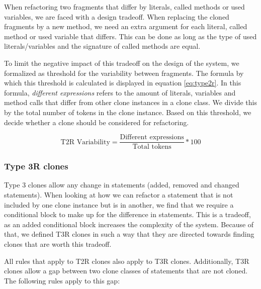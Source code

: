 \documentclass[a4paper]{article}
\begin{document}
When refactoring two fragments that differ by literals, called methods or used variables, we are faced with a design tradeoff. When replacing the cloned fragments by a new method, we need an extra argument for each literal, called method or used variable that differs. This can be done as long as the type of used literals/variables and the signature of called methods are equal.

To limit the negative impact of this tradeoff on the design of the system, we formalized as threshold for the variability between fragments. The formula by which this threshold is calculated is displayed in equation \ref{eq:type2r}. In this formula, \textit{different expressions} refers to the amount of literals, variables and method calls that differ from other clone instances in a clone class. We divide this by the total number of tokens in the clone instance. Based on this threshold, we decide whether a clone should be considered for refactoring.

\begin{equation}\label{eq:type2r}
\text{T2R Variability}=\frac{\text{Different expressions}}{\text{Total tokens}}*100
\end{equation}

\subsubsection{Type 3R clones}\label{sec:type3r}
Type 3 clones allow any change in statements (added, removed and changed statements). When looking at how we can refactor a statement that is not included by one clone instance but is in another, we find that we require a conditional block to make up for the difference in statements. This is a tradeoff, as an added conditional block increases the complexity of the system. Because of that, we defined T3R clones in such a way that they are directed towards finding clones that are worth this tradeoff.

All rules that apply to T2R clones also apply to T3R clones. Additionally, T3R clones allow a gap between two clone classes of statements that are not cloned. The following rules apply to this gap:
\end{document}
